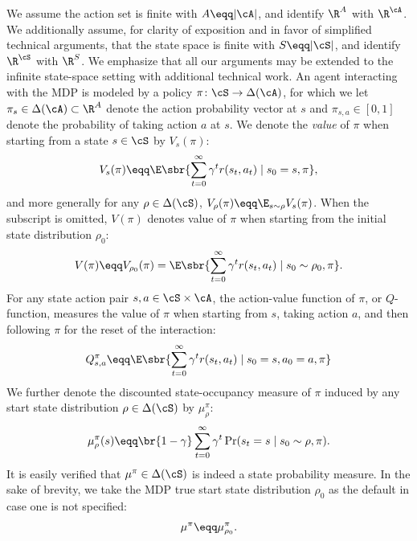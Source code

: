 We assume the action set is finite with $A\eqq |\cA|$, and identify $\R^A$ with $\R^\cA$. We additionally assume, for clarity of exposition and in favor of simplified technical arguments, that the state space is finite with $S\eqq |\cS|$, and identify $\R^\cS$ with $\R^S$.
We emphasize that all our arguments may be extended to the infinite state-space setting with additional technical work.
An agent interacting with the MDP is modeled by a policy $\pi \colon \cS \to \Delta(\cA)$, for which we let $\pi_s \in \Delta(\cA)\subset\R^A$ denote the action probability vector at $s$ and $\pi_{s, a}\in [0,1]$ denote the probability of taking action $a$ at $s$. We denote the \emph{value} of $\pi$ when starting from a state $s\in \cS$ by $V_s(\pi)$:
\begin{align*}
    V_s(\pi) \eqq \E\sbr{\sum_{t=0}^\infty \gamma^t r(s_t, a_t) \mid s_0 = s, \pi},
\end{align*}
and more generally for any $\rho\in \Delta(\cS)$,
$V_\rho(\pi) \eqq \E_{s \sim \rho}V_{s}(\pi)$. When the subscript is omitted, $V(\pi)$ denotes value of $\pi$ when starting from the initial state distribution $\rho_0$:
\begin{align*}
    V(\pi) \eqq V_{\rho_0}(\pi) =  \E\sbr{\sum_{t=0}^\infty \gamma^t r(s_t, a_t) \mid s_0 \sim \rho_0, \pi}.
\end{align*}
For any state action pair $s,a\in \cS\times \cA$, the action-value function of $\pi$, or $Q$-function, measures the value of $\pi$ when starting from $s$, taking action $a$, and then following $\pi$ for the reset of the interaction:
\begin{align*}
    Q^\pi_{s, a} \eqq \E\sbr{\sum_{t=0}^\infty \gamma^t r(s_t, a_t) \mid s_0 = s, a_0=a, \pi}
\end{align*}
We further denote the discounted state-occupancy measure of $\pi$ induced by any start state distribution $\rho\in \Delta(\cS)$ by $\mu^\pi_\rho$:
\begin{align*}
    \mu^\pi_{\rho}(s) \eqq 
    \br{1-\gamma}\sum_{t=0}^\infty \gamma^t \Pr(s_t = s \mid s_0 \sim \rho, \pi).
\end{align*}
It is easily verified that $\mu^\pi\in \Delta(\cS)$ is indeed a state probability measure.
In the sake of brevity, we take the MDP true start state distribution $\rho_0$ as the default in case one is not specified:
\begin{align}
    \mu^\pi \eqq \mu^\pi_{\rho_0}.
\end{align}


